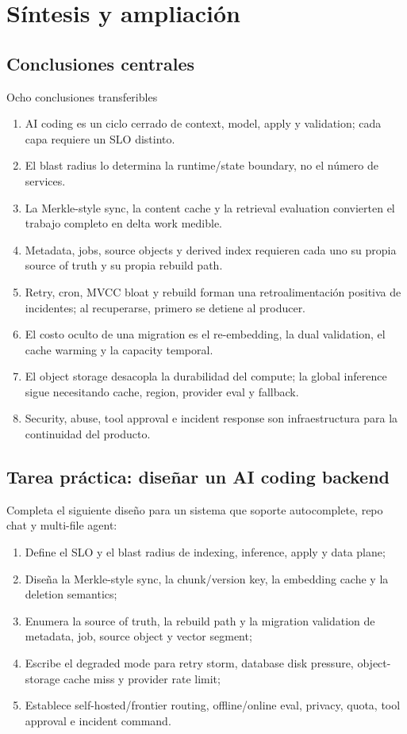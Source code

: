 \documentclass[a4paper]{article}
\begin{document}
\section{Síntesis y ampliación}

\subsection{Conclusiones centrales}

\begin{importantbox}{Ocho conclusiones transferibles}
\begin{enumerate}
  \item AI coding es un ciclo cerrado de context, model, apply y validation; cada capa requiere un SLO distinto.
  \item El blast radius lo determina la runtime/state boundary, no el número de services.
  \item La Merkle-style sync, la content cache y la retrieval evaluation convierten el trabajo completo en delta work medible.
  \item Metadata, jobs, source objects y derived index requieren cada uno su propia source of truth y su propia rebuild path.
  \item Retry, cron, MVCC bloat y rebuild forman una retroalimentación positiva de incidentes; al recuperarse, primero se detiene al producer.
  \item El costo oculto de una migration es el re-embedding, la dual validation, el cache warming y la capacity temporal.
  \item El object storage desacopla la durabilidad del compute; la global inference sigue necesitando cache, region, provider eval y fallback.
  \item Security, abuse, tool approval e incident response son infraestructura para la continuidad del producto.
\end{enumerate}
\end{importantbox}

\subsection{Tarea práctica: diseñar un AI coding backend}

Completa el siguiente diseño para un sistema que soporte autocomplete, repo chat y multi-file agent:

\begin{enumerate}
  \item Define el SLO y el blast radius de indexing, inference, apply y data plane;
  \item Diseña la Merkle-style sync, la chunk/version key, la embedding cache y la deletion semantics;
  \item Enumera la source of truth, la rebuild path y la migration validation de metadata, job, source object y vector segment;
  \item Escribe el degraded mode para retry storm, database disk pressure, object-storage cache miss y provider rate limit;
  \item Establece self-hosted/frontier routing, offline/online eval, privacy, quota, tool approval e incident command.
\end{enumerate}
\end{document}
